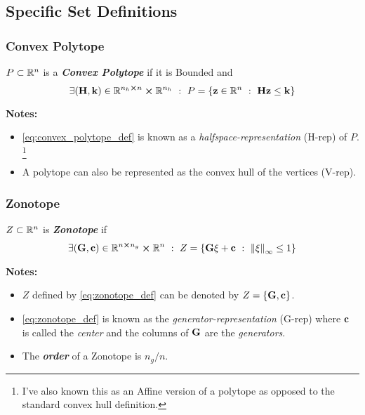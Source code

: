 \subsection{Specific Set Definitions}
\subsubsection{Convex Polytope}
\begin{definition}
    $P \subset \mathbb{R}^n$ is a \emph{\textbf{Convex Polytope}} if it is Bounded and \begin{equation} \label{eq:convex_polytope_def}
        \exists (\vb{H}, \vb{k}) \in \mathbb{R}^{n_h \cross n} \cross \mathbb{R}^{n_h} \ : \  P = \{\vb{z} \in \mathbb{R}^n \ : \  \vb{H} \vb{z} \leq \vb{k}\}
    \end{equation}
\end{definition}

\textbf{Notes:}
\begin{itemize}
    \item \eqref{eq:convex_polytope_def} is known as a \emph{halfspace-representation} (H-rep) of $P$.
    \footnote{I've also known this as an Affine version of a polytope as opposed to the standard convex hull definition.} 
    \item A polytope can also be represented as the convex hull of the vertices (V-rep).
\end{itemize}

\subsubsection{Zonotope}
\begin{definition}
    $Z \subset \mathbb{R}^n$ is \emph{\textbf{Zonotope}} if \begin{equation}\label{eq:zonotope_def}
        \exists (\vb{G}, \vb{c}) \in \mathbb{R}^{n \cross n_g} \cross \mathbb{R}^{n} \ : \  Z = \{\vb{G} \xi + \vb{c} \ : \  \norm{\xi}_\infty \leq 1\}
    \end{equation}
\end{definition}

\textbf{Notes:}
\begin{itemize}
    \item $Z$ defined by \eqref{eq:zonotope_def} can be denoted by $Z = \{\vb{G}, \vb{c}\}$.
    \item \eqref{eq:zonotope_def} is known as the \emph{generator-representation} (G-rep) where $\vb{c}$ is called the \emph{center} and the columns of $\vb{G}$ are the \emph{generators}.
    \item The \emph{\textbf{order}} of a Zonotope is $n_g / n$.
\end{itemize}


